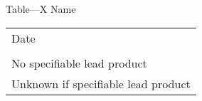 Table---X Name \\
\begin{tabular}{p{5cm}}
\hline \hline
\\
\hline
Date\\
\\
No specifiable lead product\\
Unknown if specifiable lead product \\



\end{tabular}